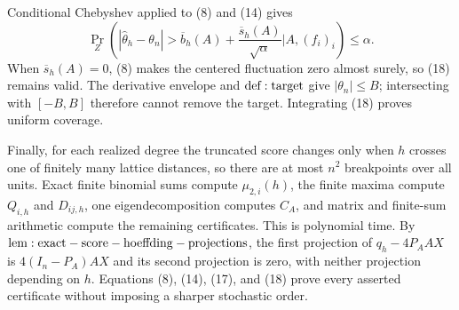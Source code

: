 Conditional Chebyshev applied to (8) and (14) gives
\[
 \Pr_Z\!\left(
 |\widehat\theta_h-\theta_n|>
 \overline b_h(A)+\frac{\overline s_h(A)}{\sqrt\alpha}
 \mathrel{\Big|}A,(f_i)_i\right)\leq\alpha.
\tag{18}
\]
When \(\overline s_h(A)=0\), (8) makes the centered fluctuation zero almost surely, so (18) remains valid.  The derivative envelope and \({\rm def:target}\) give \(|\theta_n|\leq B\); intersecting with \([-B,B]\) therefore cannot remove the target.  Integrating (18) proves uniform coverage.

Finally, for each realized degree the truncated score changes only when \(h\) crosses one of finitely many lattice distances, so there are at most \(n^2\) breakpoints over all units.  Exact finite binomial sums compute \(\mu_{2,i}(h)\), the finite maxima compute \(Q_{i,h}\) and \(D_{ij,h}\), one eigendecomposition computes \(C_A\), and matrix and finite-sum arithmetic compute the remaining certificates.  This is polynomial time.  By \({\rm lem:exact-score-hoeffding-projections}\), the first projection of \(q_h-4P_AAX\) is \(4(I_n-P_A)AX\) and its second projection is zero, with neither projection depending on \(h\).  Equations (8), (14), (17), and (18) prove every asserted certificate without imposing a sharper stochastic order.